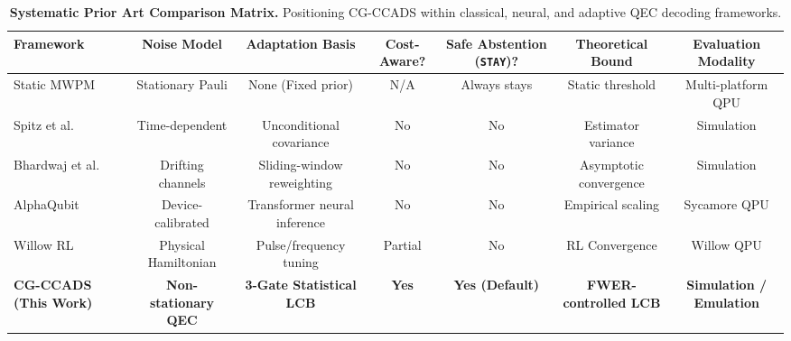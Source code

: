\begin{table}[t]
\centering
\small
\caption{\textbf{Systematic Prior Art Comparison Matrix.} Positioning CG-CCADS within classical, neural, and adaptive QEC decoding frameworks.}
\label{tab:prior_art}
\begin{tabular}{lcccccc}
\toprule
\textbf{Framework} & \textbf{Noise Model} & \textbf{Adaptation Basis} & \textbf{Cost-Aware?} & \textbf{Safe Abstention (\texttt{STAY})?} & \textbf{Theoretical Bound} & \textbf{Evaluation Modality} \\
\midrule
Static MWPM~\cite{dennis2002,fowler2012} & Stationary Pauli & None (Fixed prior) & N/A & Always stays & Static threshold & Multi-platform QPU \\
Spitz et al.~\cite{spitz2018} & Time-dependent & Unconditional covariance & No & No & Estimator variance & Simulation \\
Bhardwaj et al.~\cite{bhardwaj2026} & Drifting channels & Sliding-window reweighting & No & No & Asymptotic convergence & Simulation \\
AlphaQubit~\cite{alphaqubit2024} & Device-calibrated & Transformer neural inference & No & No & Empirical scaling & Sycamore QPU \\
Willow RL~\cite{willow2026} & Physical Hamiltonian & Pulse/frequency tuning & Partial & No & RL Convergence & Willow QPU \\
\textbf{CG-CCADS (This Work)} & \textbf{Non-stationary QEC} & \textbf{3-Gate Statistical LCB} & \textbf{Yes} & \textbf{Yes (Default)} & \textbf{FWER-controlled LCB} & \textbf{Simulation / Emulation} \\
\bottomrule
\end{tabular}
\end{table}
